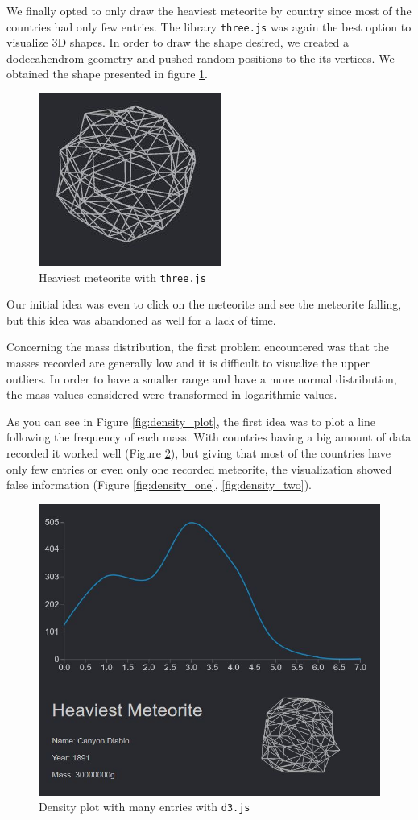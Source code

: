 \documentclass[10pt,conference,compsocconf]{IEEEtran}
\begin{document}
We finally opted to only draw the heaviest meteorite by country since most of the countries had only few entries. The library \texttt{three.js} was again the best option to visualize 3D shapes. In order to draw the shape desired, we created a dodecahendrom geometry and pushed random positions to the its vertices. We obtained the shape presented in figure \ref{fig:biggest_three}.

\begin{figure}[]
  \centering
  \includegraphics[width=.5\columnwidth]{images/biggestmeteorite}
  \caption{Heaviest meteorite with \texttt{three.js}}
  \label{fig:biggest_three}
\end{figure}

Our initial idea was even to click on the meteorite and see the meteorite falling, but this idea was abandoned as well for a lack of time.

Concerning the mass distribution, the first problem encountered was that the masses recorded are generally low and it is difficult to visualize the upper outliers. In order to have a smaller range and have a more normal distribution, the mass values considered were transformed in logarithmic values.

As you can see in Figure \ref{fig:density_plot}, the first idea was to plot a line following the frequency of each mass. With countries having a big amount of data recorded it worked well (Figure \ref{fig:density_good}), but giving that most of the countries have only few entries or even only one recorded meteorite, the visualization showed false information (Figure \ref{fig:density_one}, \ref{fig:density_two}).

\begin{figure}[]
  \centering
  \includegraphics[width=.5\columnwidth]{images/good_density_plot}
  \caption{Density plot with many entries with \texttt{d3.js}}
  \label{fig:density_good}
\end{figure}
\end{document}
